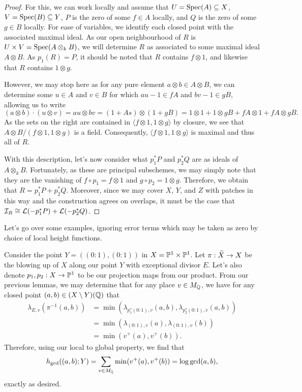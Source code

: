 \begin{proof}
    For this, we can work locally and assume that $U = {\rm Spec}(A) \subseteq X$, $V = {\rm Spec}(B) \subseteq Y$, 
    $P$ is the zero of some $f \in A$ locally, and $Q$ is the zero of some $g \in B$ locally.
    For ease of variables, we identify each closed point with the associated maximal ideal.
    As our open neighbourhood of $R$ is $U \times V = {\rm Spec}(A \otimes_k B)$,
    we will determine $R$ as associated to some maximal ideal $A \otimes B$.
    As $p_1(R) = P$, it should be noted that $R$ contains $f \otimes 1$,
    and likewise that $R$ contains $1 \otimes g$.
    
    However, we may stop here as for any pure element $a \otimes b \in A \otimes B$,
    we can determine some $u \in A$ and $v \in B$ for which $au - 1 \in fA$ and $bv -1 \in gB$,
    allowing us to write
    \[
        (a \otimes b) \cdot (u \otimes v)
        = au \otimes bv
        = (1 + As) \otimes (1 + gB)
        = 1 \otimes 1 + 1 \otimes gB + fA \otimes 1 + fA \otimes gB.
    \]
    As the sets on the right are contained in $\langle f \otimes 1, 1 \otimes g \rangle$ by closure,
    we see that $A \otimes B / (f \otimes 1, 1 \otimes g)$ is a field.
    Consequently, $\langle f \otimes 1, 1 \otimes g \rangle$ is maximal and thus all of $R$.

    With this description, let's now consider what $p_1^*P$ and $p_2^*Q$ are as ideals of $A \otimes_k B$.
    Fortunately, as these are principal subschemes,
    we may simply note that they are the vanishing of $f \circ p_1 = f \otimes 1$ and $g \circ p_2 = 1 \otimes g$.
    Therefore, we obtain that $R = p_1^*P + p_2^*Q$.
    Moreover, since we may cover $X$, $Y$, and $Z$ with patches in this way and the construction agrees on overlaps,
    it must be the case that $\mathcal{I}_R \cong \mathcal{L}(-p_1^*P) + \mathcal{L}(-p_2^*Q)$.
\end{proof}

Let's go over some examples, ignoring error terms which may be taken as zero by choice of local height functions.

\begin{example}
    Consider the point $Y = ((0: 1), (0: 1))$ in $X = \mathbb{P}^1 \times \mathbb{P}^1$.
    Let $\pi : \widetilde X \to X$ be the blowing up of $X$ along our point $Y$ with exceptional divisor $E$. 
    Let's also denote $p_1, p_2: X \to \mathbb{P}^1$ to be our projection maps from our product.
    From our previous lemmas, we may determine that for any place $v \in M_{\mathbb{Q}}$,
    we have for any closed point $(a, b) \in (X \setminus Y)(\mathbb{Q})$ that
    \begin{align*}
        \lambda_{E, v}(\pi^{-1}(a, b)) 
        & = \min(\lambda_{p_1^*(0: 1), v}(a, b), \lambda_{p_2^*(0: 1), v}(a, b)) \\
        & = \min(\lambda_{(0: 1), v}(a), \lambda_{(0: 1), v}(b)) \\
        & = \min(v^+(a), v^+(b)).
    \end{align*}
    Therefore, using our local to global property, we find that
    \[
        h_{\gcd}((a, b); Y) 
        = \sum_{v \in M_{\mathbb{Q}}} \min(v^+(a), v^+(b))
        = \log \gcd(a, b),
    \]
    exactly as desired.
\end{example}

